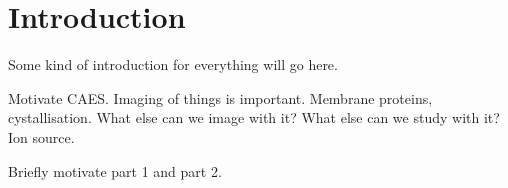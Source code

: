  \chapter{Introduction}
 
\setcounter{page}{1}

Some kind of introduction for everything will go here.

Motivate CAES. Imaging of things is important. Membrane proteins, cystallisation. What else can we image with it? What else can we study with it? Ion source.

Briefly motivate part 1 and part 2.

